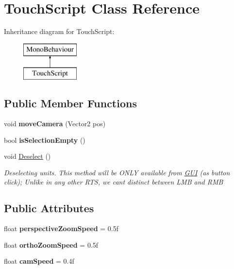 \hypertarget{class_touch_script}{}\section{Touch\+Script Class Reference}
\label{class_touch_script}
Inheritance diagram for Touch\+Script\+:\begin{figure}[H]
\begin{center}
\leavevmode
\includegraphics[height=2.000000cm]{class_touch_script}
\end{center}
\end{figure}
\subsection*{Public Member Functions}
\begin{DoxyCompactItemize}
\item 
\hypertarget{class_touch_script_a027750246e165fb97f184b3fc9b2f7e0}{}void {\bfseries move\+Camera} (Vector2 pos)\label{class_touch_script_a027750246e165fb97f184b3fc9b2f7e0}

\item 
\hypertarget{class_touch_script_a7fbf8ec146bfbf2feafd21783dd7c4ec}{}bool {\bfseries is\+Selection\+Empty} ()\label{class_touch_script_a7fbf8ec146bfbf2feafd21783dd7c4ec}

\item 
void \hyperlink{class_touch_script_a8c1933e1833a5f1eb7e2658a013a9bda}{Deselect} ()
\begin{DoxyCompactList}\small\item\em Deselecting units. This method will be O\+N\+L\+Y available from \hyperlink{class_g_u_i}{G\+U\+I} (as button click); Unlike in any other R\+T\+S, we can\textquotesingle{}t distinct between L\+M\+B and R\+M\+B \end{DoxyCompactList}\end{DoxyCompactItemize}
\subsection*{Public Attributes}
\begin{DoxyCompactItemize}
\item 
\hypertarget{class_touch_script_af969f39598228c6a2811210792a55062}{}float {\bfseries perspective\+Zoom\+Speed} = 0.\+5f\label{class_touch_script_af969f39598228c6a2811210792a55062}

\item 
\hypertarget{class_touch_script_a2025f31be14f42bf31091d973189a942}{}float {\bfseries ortho\+Zoom\+Speed} = 0.\+5f\label{class_touch_script_a2025f31be14f42bf31091d973189a942}

\item 
\hypertarget{class_touch_script_ab9e51b820e947edc78b6f0d9f3f7ee30}{}float {\bfseries cam\+Speed} = 0.\+4f\label{class_touch_script_ab9e51b820e947edc78b6f0d9f3f7ee30}

\end{DoxyCompactItemize}



